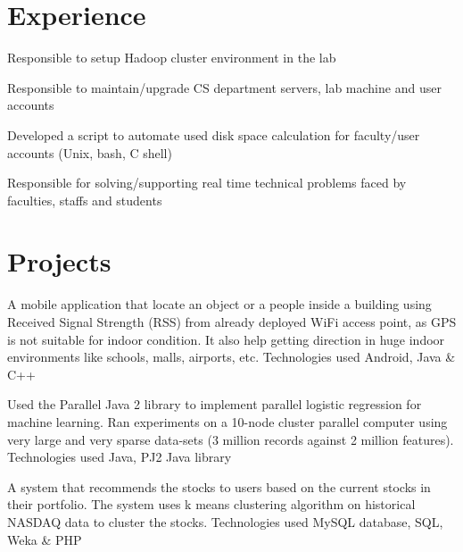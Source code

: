 \documentclass[]{main}
\begin{document}
\hfill
\begin{minipage}[t]{0.73\textwidth} 


\section{Experience}

\vspace{\topsep} %
\begin{tightemize}
\item Responsible to setup Hadoop cluster environment in the lab
\item Responsible to maintain/upgrade CS department servers, lab machine and user accounts
\item Developed a script to automate used disk space calculation for faculty/user accounts (Unix, bash, C shell)
\item Responsible for solving/supporting real time technical problems faced by faculties, staffs and students
\end{tightemize}
\sectionsep

\section{Projects}
\sectionsep

 
A mobile application that locate an object or a people inside a building using Received Signal Strength (RSS) from already deployed WiFi access point, as GPS is not suitable for indoor condition.
It also help getting direction in huge indoor environments like schools, malls, airports, etc.
Technologies used Android, Java \& C++
\sectionsep

 
Used the Parallel Java 2 library to implement parallel logistic regression for machine learning.
Ran experiments on a 10-node cluster parallel computer using very large and very sparse data-sets (3 million records against 2 million features).
Technologies used Java, PJ2 Java library
\sectionsep

 
A system that recommends the stocks to users based on the current stocks in their portfolio. 
The system uses k means clustering algorithm on historical NASDAQ data to cluster the stocks. 
Technologies used MySQL database, SQL, Weka \& PHP
\sectionsep


\end{minipage}
\end{document}
